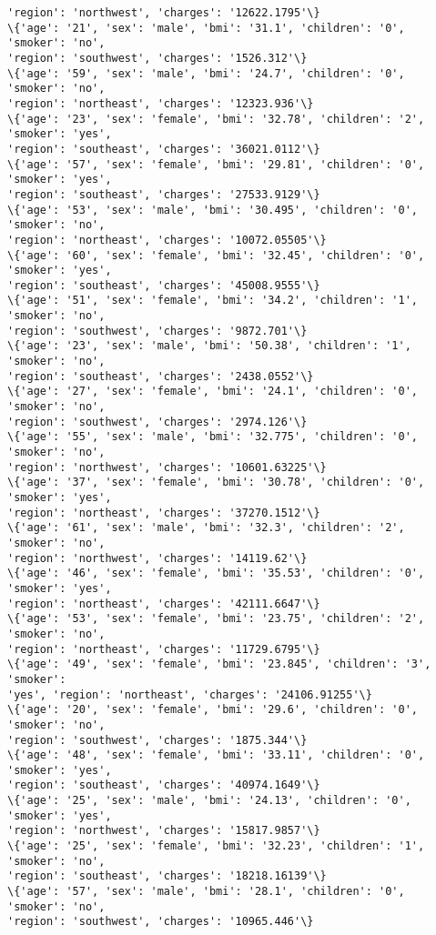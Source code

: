 \documentclass[11pt]{article}
\begin{document}
\begin{Verbatim}[commandchars=\\\{\}]
'region': 'northwest', 'charges': '12622.1795'\}
\{'age': '21', 'sex': 'male', 'bmi': '31.1', 'children': '0', 'smoker': 'no',
'region': 'southwest', 'charges': '1526.312'\}
\{'age': '59', 'sex': 'male', 'bmi': '24.7', 'children': '0', 'smoker': 'no',
'region': 'northeast', 'charges': '12323.936'\}
\{'age': '23', 'sex': 'female', 'bmi': '32.78', 'children': '2', 'smoker': 'yes',
'region': 'southeast', 'charges': '36021.0112'\}
\{'age': '57', 'sex': 'female', 'bmi': '29.81', 'children': '0', 'smoker': 'yes',
'region': 'southeast', 'charges': '27533.9129'\}
\{'age': '53', 'sex': 'male', 'bmi': '30.495', 'children': '0', 'smoker': 'no',
'region': 'northeast', 'charges': '10072.05505'\}
\{'age': '60', 'sex': 'female', 'bmi': '32.45', 'children': '0', 'smoker': 'yes',
'region': 'southeast', 'charges': '45008.9555'\}
\{'age': '51', 'sex': 'female', 'bmi': '34.2', 'children': '1', 'smoker': 'no',
'region': 'southwest', 'charges': '9872.701'\}
\{'age': '23', 'sex': 'male', 'bmi': '50.38', 'children': '1', 'smoker': 'no',
'region': 'southeast', 'charges': '2438.0552'\}
\{'age': '27', 'sex': 'female', 'bmi': '24.1', 'children': '0', 'smoker': 'no',
'region': 'southwest', 'charges': '2974.126'\}
\{'age': '55', 'sex': 'male', 'bmi': '32.775', 'children': '0', 'smoker': 'no',
'region': 'northwest', 'charges': '10601.63225'\}
\{'age': '37', 'sex': 'female', 'bmi': '30.78', 'children': '0', 'smoker': 'yes',
'region': 'northeast', 'charges': '37270.1512'\}
\{'age': '61', 'sex': 'male', 'bmi': '32.3', 'children': '2', 'smoker': 'no',
'region': 'northwest', 'charges': '14119.62'\}
\{'age': '46', 'sex': 'female', 'bmi': '35.53', 'children': '0', 'smoker': 'yes',
'region': 'northeast', 'charges': '42111.6647'\}
\{'age': '53', 'sex': 'female', 'bmi': '23.75', 'children': '2', 'smoker': 'no',
'region': 'northeast', 'charges': '11729.6795'\}
\{'age': '49', 'sex': 'female', 'bmi': '23.845', 'children': '3', 'smoker':
'yes', 'region': 'northeast', 'charges': '24106.91255'\}
\{'age': '20', 'sex': 'female', 'bmi': '29.6', 'children': '0', 'smoker': 'no',
'region': 'southwest', 'charges': '1875.344'\}
\{'age': '48', 'sex': 'female', 'bmi': '33.11', 'children': '0', 'smoker': 'yes',
'region': 'southeast', 'charges': '40974.1649'\}
\{'age': '25', 'sex': 'male', 'bmi': '24.13', 'children': '0', 'smoker': 'yes',
'region': 'northwest', 'charges': '15817.9857'\}
\{'age': '25', 'sex': 'female', 'bmi': '32.23', 'children': '1', 'smoker': 'no',
'region': 'southeast', 'charges': '18218.16139'\}
\{'age': '57', 'sex': 'male', 'bmi': '28.1', 'children': '0', 'smoker': 'no',
'region': 'southwest', 'charges': '10965.446'\}

\end{Verbatim}
\end{document}
